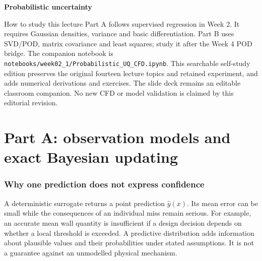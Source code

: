 \documentclass[11pt]{article}
\begin{document}
\begin{titlepage}
\centering\vspace*{25mm}
{\Huge\bfseries Probabilistic uncertainty\par}
\vspace{5mm}{\LARGE for CFD surrogates\par}
\vspace{12mm}{\Large Observation models, posterior prediction, calibration\par}
\vspace{15mm}{\large MIE 690A: AI in Fluid Mechanics\par}
\vspace{5mm}{\large Instructor: Ehsan Roohi\par}
\vfill
\begin{worked}{How to study this lecture}
Part A follows supervised regression in Week 2. It requires Gaussian densities,
variance and basic differentiation. Part B uses SVD/POD, matrix covariance and
least squares; study it after the Week 4 POD bridge. The companion notebook is
\texttt{notebooks/week02\_1/Probabilistic\_UQ\_CFD.ipynb}.
This searchable self-study edition preserves the original fourteen lecture
topics and retained experiment, and adds numerical derivations and exercises.
The slide deck remains an editable classroom companion. No new CFD or model
validation is claimed by this editorial revision.
\end{worked}
\end{titlepage}
\tableofcontents\newpage
\part*{Part A: observation models and exact Bayesian updating}
\section{Why one prediction does not express confidence}
A deterministic surrogate returns a point prediction $\widehat y(x)$. Its mean
error can be small while the consequences of an individual miss remain serious.
For example, an accurate mean wall quantity is insufficient if a design decision
depends on whether a local threshold is exceeded. A predictive distribution
adds information about plausible values and their probabilities under stated
assumptions. It is not a guarantee against an unmodelled physical mechanism.
\end{document}
